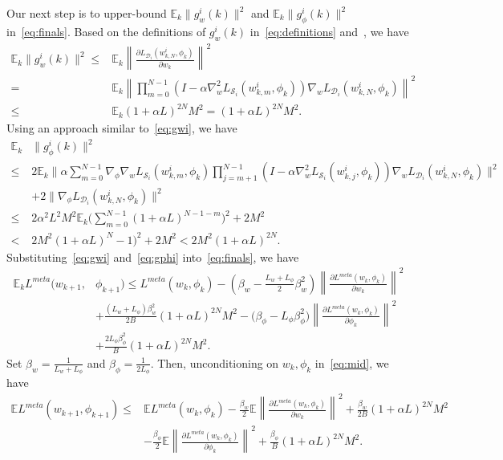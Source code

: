 \documentclass{osudissert96}
\begin{document}
 Our next
step is to upper-bound $\mathbb{E}_k\big\|g_{w}^i(k) \big\|^2$ and $\mathbb{E}_k\big\|g_{\phi}^i(k) \big\|^2$ in~\cref{eq:finals}. Based on the definitions of $g_{w}^i(k)$ in~\cref{eq:definitions} and~, we have
\begin{align}\label{eq:gwi}
\mathbb{E}_k\big\|g_{w}^i(k) \big\|^2 \leq& \mathbb{E}_k\left\| \frac{\partial L_{\mathcal{D}_i}( w^i_{k,N}, \phi_k)}{\partial w_k} \right\|^2 \nonumber
\\=& \mathbb{E}_k\left\|\prod_{m=0}^{N-1}(I - \alpha \nabla_w^2L_{\mathcal{S}_i}(w_{k,m}^i,\phi_k)) \nabla_{w} L_{\mathcal{D}_i} (w_{k,N}^i,\phi_k)\right\|^2 \nonumber
\\\leq &  \mathbb{E}_k(1+\alpha L)^{2N} M^2 = (1+\alpha L)^{2N} M^2.
\end{align}
Using an approach similar to~\cref{eq:gwi}, we have
\begin{align}\label{eq:gphi}
\mathbb{E}_k&\big\|g_{\phi}^i(k) \big\|^2 \nonumber
\\ \leq& 2\mathbb{E}_k\bigg\|\alpha \sum_{m=0}^{N-1}\nabla_\phi\nabla_w L_{\mathcal{S}_i}(w_{k,m}^i,\phi_k) \prod_{j=m+1}^{N-1}(I-\alpha\nabla_w^2L_{\mathcal{S}_i}(w_{k,j}^i,\phi_k))\nabla_w L_{\mathcal{D}_i}(w_{k,N}^i,\phi_k)\bigg\|^2 \nonumber
\\&+2\|\nabla_\phi L_{\mathcal{D}_i}(w_{k,N}^i,\phi_k)\|^2 \nonumber
\\ \leq& 2\alpha^2 L^2 M^2 \mathbb{E}_k\Big(\sum_{m=0}^{N-1} (1+\alpha L)^{N-1-m}\Big)^2 +2 M^2 \nonumber
\\< & 2M^2 (1+\alpha L)^{N}-1)^2 +2M^2 <  2M^2 (1+\alpha L)^{2N}.
\end{align}
Substituting~\cref{eq:gwi} and~\cref{eq:gphi} into~\cref{eq:finals}, we have
\begin{align}\label{eq:mid}
\mathbb{E}_k L^{meta}(w_{k+1},&\phi_{k+1}) \leq L^{meta}(w_k,\phi_k) - \left(\beta_w-\frac{L_w+L_\phi}{2}\beta_w^2\right)\left\| \frac{\partial L^{meta}(w_k,\phi_k)}{\partial w_k}\right\|^2 \nonumber
\\&+ \frac{(L_w+L_\phi)\beta_w^2}{2B}(1+\alpha L)^{2N}M^2-\big(\beta_\phi -L_\phi\beta_\phi^2 \big)\left\| \frac{\partial L^{meta}(w_{k},\phi_k)}{\partial \phi_k}  \right\|^2\nonumber
\\ & + \frac{2 L_\phi \beta_\phi^2}{B}  (1+\alpha L)^{2N}M^2.
\end{align}
Set  $\beta_w =\frac{1}{L_w+L_\phi}$ and $\beta_\phi =  \frac{1}{2L_\phi}$. Then, unconditioning on $w_k,\phi_k$ in~\cref{eq:mid}, we have
\begin{align*}
\mathbb{E} L^{meta}(w_{k+1},\phi_{k+1}) \leq& \mathbb{E}L^{meta}(w_k,\phi_k) - \frac{\beta_w}{2}\mathbb{E}\left\| \frac{\partial L^{meta}(w_k,\phi_k)}{\partial w_k}\right\|^2 + \frac{\beta_w}{2B}(1+\alpha L)^{2N}M^2\nonumber
\\ &-\frac{\beta_\phi}{2}\mathbb{E}\left\| \frac{\partial L^{meta}(w_{k},\phi_k)}{\partial \phi_k}  \right\|^2 + \frac{\beta_\phi}{B}  (1+\alpha L)^{2N}M^2.
\end{align*}
\end{document}
